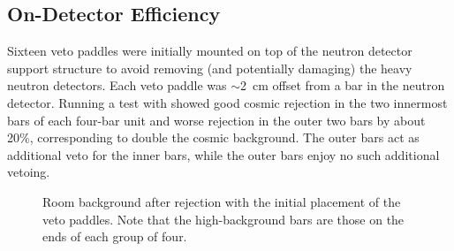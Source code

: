 \subsection{On-Detector Efficiency}

Sixteen veto paddles were initially mounted on top of the neutron detector support structure to avoid removing (and potentially damaging) the heavy neutron detectors.  Each veto paddle was $\sim$2~cm offset from a bar in the neutron detector.  Running a test with \MgReaction showed good cosmic rejection in the two innermost bars of each four-bar unit and worse rejection in the outer two bars by about 20\%, corresponding to double the cosmic background.  The outer bars act as additional veto for the inner bars, while the outer bars enjoy no such additional vetoing.  
\begin{figure}[htp]
\vspace{3in}
\caption{Room background after rejection with the initial placement of the veto paddles.  Note that the high-background bars are those on the ends of each group of four.}
\label{fig:initialBackground}
\end{figure}

